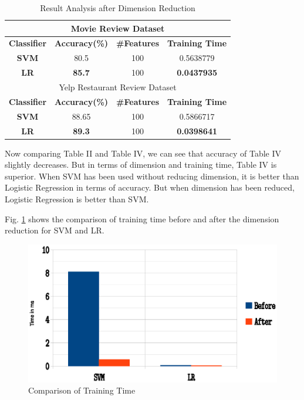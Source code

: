 \documentclass[10pt, conference]{IEEEtran}
\begin{document}
	\begin{table}[H]
		\caption{Result Analysis after Dimension Reduction}
		\begin{center}
        \begin{tabular}{|*{4}{c|}}
        \hline
        \multicolumn{4}{|c|}{Movie Review Dataset}\\
        \hline
        \textbf{Classifier} & \textbf{Accuracy(\%)} & \textbf{\#Features} & \textbf{Training Time}\\
        \hline
        \textbf{SVM} & 80.5 & 100 & 0.5638779\\
        \hline
        \textbf{LR} & \textbf{85.7} & 100 & \textbf{0.0437935}\\
        \hline
        \multicolumn{4}{|c|}{Yelp Restaurant Review Dataset}\\
        \hline
         \textbf{Classifier} & \textbf{Accuracy(\%)} & \textbf{\#Features} & \textbf{Training Time}\\
        \hline
        \textbf{SVM} & 88.65 & 100 & 0.5866717\\
        \hline
        \textbf{LR} & \textbf{89.3} & 100 & \textbf{0.0398641}\\
        \hline
        \end{tabular}
		\label{table:radr}
		\end{center}
	\end{table}
	Now comparing Table II and Table IV, we can see that accuracy of Table IV slightly decreases. But in terms of dimension and training time, Table IV is superior.	When SVM has been used without reducing dimension, it is better than Logistic Regression in terms of accuracy. But when dimension has been reduced, Logistic Regression is better than SVM.
	
	Fig. \ref{fig:compM} shows the comparison of training time before and after the dimension reduction for SVM and LR.
	\begin{figure}[H]
		\includegraphics[width = 0.35\textheight]{trainingTime.eps}
		\caption{Comparison of Training Time}
		\label{fig:compM}
	\end{figure}
	
\end{document}
